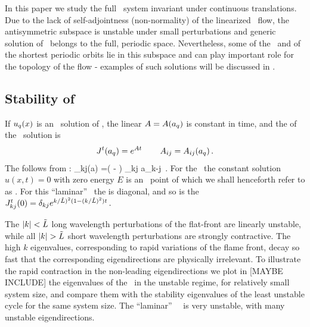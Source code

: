 In this paper we study the full \KS\ system invariant
under continuous translations. Due to the lack of self-adjointness
(non-normality) of the linearized \KS\ flow,
the antisymmetric subspace
is unstable under small perturbations and generic solution of
\KSe\ belongs to the full, periodic space. Nevertheless, some of
the \eqva\ and of the shortest periodic orbits lie in this subspace
and can play important role for the topology of the flow - examples
of such solutions will be discussed in .


\subsection{Stability of \eqva}
\label{s:StabEqui}

If $u_q(x)$ is an \eqv\ solution of \KSe,
the linear {\stabmat}
${A}={A}(a_q)$
is constant in time,
and
the {\jacobianM}
of the \eqv\ solution is
\[
 {J}^t(a_q) = e^{{A} t}
    \,\qquad
 A_{ij}= A_{ij}(a_q)
\,.
\]
The {\stabmat}
follows from :
\beq
{\Mvar}_{kj}(a) %
=\left(  -   \right)
  \delta_{kj}  a_{k-j}
\,.
For the \KSe\ the constant solution $u(x,t)=0$ with zero energy $E$ is an
\eqv\ point of  which we shall henceforth refer to as
. For this ``laminar'' \eqv\ the {\stabmat}
is diagonal, and
so is the {\jacobianM}
$
{J}^t_{kj}(0) = \delta_{kj} e^{k/\tilde{L})^2(1- (k/\tilde{L})^2)t}
\,.
$

The $|k|<\tilde{L}$
long wavelength perturbations of the flat-front {\eqv}
are linearly unstable, while all
$|k|> \tildeL$ short wavelength perturbations are strongly contractive.
The high $k$ eigenvalues, corresponding to rapid variations of
the flame front, decay so fast that the corresponding eigendirections
are physically irrelevant.
To illustrate the rapid contraction in the non-leading eigendirections
we plot  in [MAYBE INCLUDE] %
the eigenvalues of the \eqv\ in the unstable regime,
for relatively small system size, %
and compare them with the
stability eigenvalues of the least unstable cycle for the same
system size.
The ``laminar'' ~\eqv\ is very unstable,
with many unstable eigendirections.


